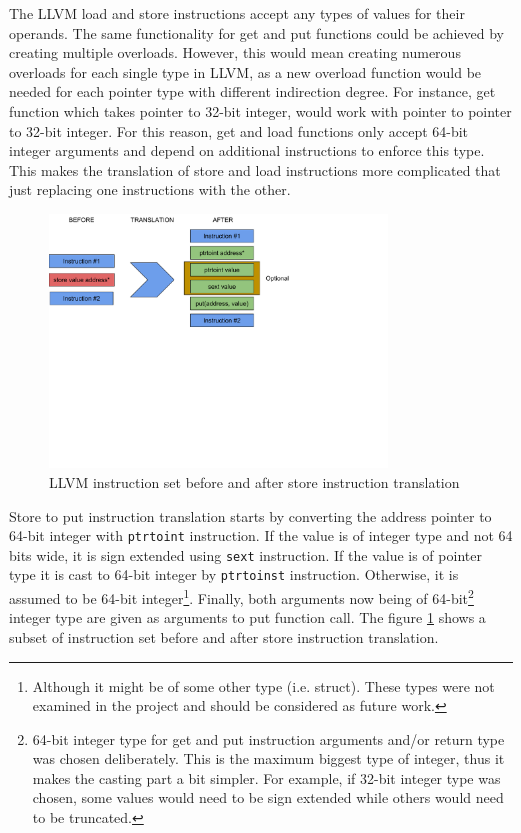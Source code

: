 \documentclass[bsc,frontabs,twoside,singlespacing,parskip,deptreport]{infthesis}     %
\begin{document}
The LLVM load and store instructions accept any types of values for their operands. The same functionality for get and put functions could be achieved by creating multiple overloads. However, this would mean creating numerous overloads for each single type in LLVM, as a new overload function would be needed for each pointer type with different indirection degree. For instance, get function which takes pointer to 32-bit integer, would work with pointer to pointer to 32-bit integer. For this reason, get and load functions only accept 64-bit integer arguments and depend on additional instructions to enforce this type. This makes the translation of store and load instructions more complicated that just replacing one instructions with the other.

\begin{figure}[H]
\centering
\includegraphics[width=0.8\textwidth]{images/store_translation}
\caption{LLVM instruction set before and after store instruction translation}
\label{fig:store_translation}
\end{figure}

Store to put instruction translation starts by converting the address pointer to 64-bit integer with \texttt{ptrtoint} instruction. If the value is of integer type and not 64 bits wide, it is sign extended using \texttt{sext} instruction. If the value is of pointer type it is cast to 64-bit integer by \texttt{ptrtoinst} instruction. Otherwise, it is assumed to be 64-bit integer\footnote{Although it might be of some other type (i.e. struct). These types were not examined in the project and should be considered as future work.}. Finally, both arguments now being of 64-bit\footnote{64-bit integer type for get and put instruction arguments and/or return type was chosen deliberately. This is the maximum biggest type of integer, thus it makes the casting part a bit simpler. For example, if 32-bit integer type was chosen, some values would need to be sign extended while others would need to be truncated.} integer type are given as arguments to put function call. The figure \ref{fig:store_translation} shows a subset of instruction set before and after store instruction translation.
\end{document}
